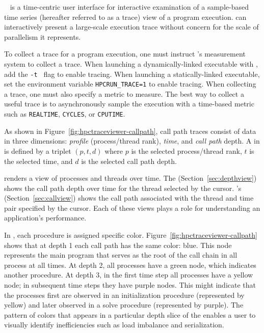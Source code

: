 \hpctraceviewer{}~\cite{Tallent-MC-etal:2011:ICS-hpctoolkit-scalable-tracing} is a time-centric user interface for interactive examination of a sample-based time series (hereafter referred to as a trace) view of a program execution.
 \hpctraceviewer{} can interactively present a large-scale execution trace without concern for the scale of parallelism it represents.

To collect a trace for a program execution, one must instruct \HPCToolkit{}'s measurement system to collect a trace.
When launching a dynamically-linked executable with \hpcrun{}, add the {\tt -t } flag to enable tracing.
When launching a statically-linked executable, set the environment variable \verb|HPCRUN_TRACE=1| to enable tracing.
When collecting a trace, one must also specify a metric to measure.  The best way to collect a useful trace is to asynchronously sample the execution with a time-based metric such as {\tt REALTIME}, {\tt CYCLES}, or {\tt CPUTIME}.

As shown in Figure~\ref{fig:hpctraceviewer-callpath},  call path traces consist of data in three dimensions: \emph{profile} (process/thread rank), \emph{time}, and \emph{call path} depth.
A \emph{\crosshair} in \hpctraceviewer{} is defined by a triplet $(p,t,d)$ where $p$ is the selected process/thread rank, $t$ is the selected time, and $d$ is the selected call path depth.

\hpctraceviewer{} renders a view of processes and threads over time. The \emph{\depthview} (Section~\ref{sec:depthview}) shows the call path depth over time for the thread selected by the cursor.
\hpctraceviewer{}'s  \emph{\callview}  (Section~\ref{sec:callview}) shows the call path associated with the thread and time pair specified by the cursor.
Each of these views plays a role for understanding an application's performance.

In \hpctraceviewer, each procedure is assigned specific color. Figure~\ref{fig:hpctraceviewer-callpath} shows that at depth 1   each call path has the same color: blue. This node represents the main program that serves as the root of the call chain in all process at all times. At depth 2, all processes have a green node, which indicates another procedure.
At depth 3, in the first time step all processes  have a yellow node; in subsequent time steps they have purple nodes.
This might indicate that the processes first are observed in an initialization procedure (represented by yellow) and later observed in a solve procedure (represented by purple). The pattern of colors that appears in a particular depth slice of the \traceview{} enables a user to visually identify inefficiencies such as load imbalance and serialization.




